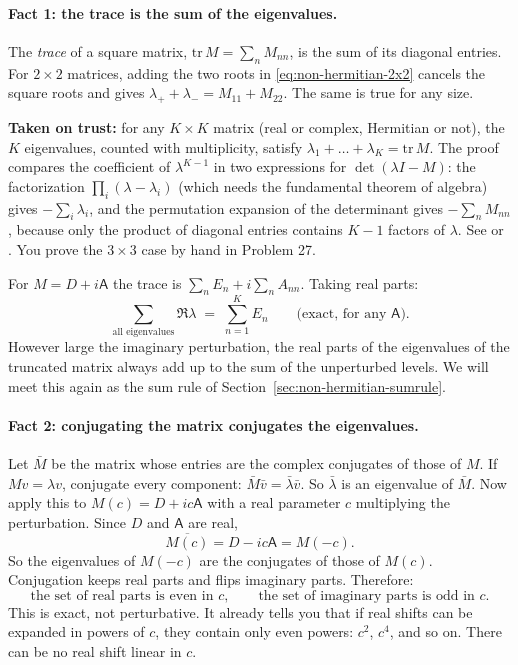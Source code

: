 \paragraph{Fact 1: the trace is the sum of the eigenvalues.} The \emph{trace} of a square matrix, $\mathrm{tr}\,M=\sum_n M_{nn}$, is the sum of its diagonal entries. For $2\times2$ matrices, adding the two roots in \eqref{eq:non-hermitian-2x2} cancels the square roots and gives $\lambda_++\lambda_-=M_{11}+M_{22}$. The same is true for any size.

\begin{beyond}
\textbf{Taken on trust:} for any $K\times K$ matrix (real or complex, Hermitian or not), the $K$ eigenvalues, counted with multiplicity, satisfy $\lambda_1+\dots+\lambda_K=\mathrm{tr}\,M$. The proof compares the coefficient of $\lambda^{K-1}$ in two expressions for $\det(\lambda I - M)$: the factorization $\prod_i(\lambda-\lambda_i)$ (which needs the fundamental theorem of algebra) gives $-\sum_i\lambda_i$, and the permutation expansion of the determinant gives $-\sum_n M_{nn}$, because only the product of diagonal entries contains $K-1$ factors of $\lambda$. See \cite{strang} or \cite{rhb}. You prove the $3\times3$ case by hand in Problem 27.
\end{beyond}

For $M=D+i\mathsf A$ the trace is $\sum_n E_n + i\sum_n A_{nn}$. Taking real parts:
\begin{equation}
\sum_{\text{all eigenvalues}}\Re\lambda \;=\; \sum_{n=1}^{K}E_n \qquad\text{(exact, for any $\mathsf A$)}.
\label{eq:non-hermitian-tracerule}
\end{equation}
However large the imaginary perturbation, the real parts of the eigenvalues of the truncated matrix always add up to the sum of the unperturbed levels. We will meet this again as the sum rule of Section~\ref{sec:non-hermitian-sumrule}.

\paragraph{Fact 2: conjugating the matrix conjugates the eigenvalues.} Let $\bar M$ be the matrix whose entries are the complex conjugates of those of $M$. If $Mv=\lambda v$, conjugate every component: $\bar M\bar v = \bar\lambda\bar v$. So $\bar\lambda$ is an eigenvalue of $\bar M$. Now apply this to $M(c)=D+ic\mathsf A$ with a real parameter $c$ multiplying the perturbation. Since $D$ and $\mathsf A$ are real,
\begin{equation}
\overline{M(c)} = D - ic\mathsf A = M(-c).
\end{equation}
So the eigenvalues of $M(-c)$ are the conjugates of those of $M(c)$. Conjugation keeps real parts and flips imaginary parts. Therefore:
\begin{equation}
\text{the set of real parts is even in } c,\qquad \text{the set of imaginary parts is odd in } c.
\label{eq:non-hermitian-parity-in-c}
\end{equation}
This is exact, not perturbative. It already tells you that if real shifts can be expanded in powers of $c$, they contain only even powers: $c^2$, $c^4$, and so on. There can be no real shift linear in $c$.

